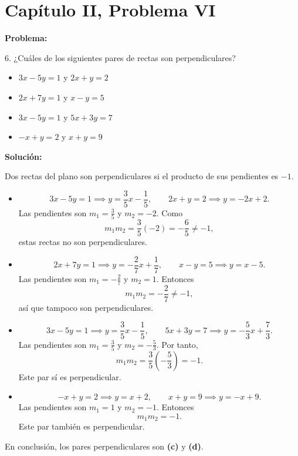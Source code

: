\section*{Capítulo II, Problema VI}

\textbf{Problema:}

6. ¿Cuáles de los siguientes pares de rectas son perpendiculares?

\begin{itemize}
    \item[(a)] $3x - 5y = 1$ y $2x + y = 2$
    \item[(b)] $2x + 7y = 1$ y $x - y = 5$
    \item[(c)] $3x - 5y = 1$ y $5x + 3y = 7$
    \item[(d)] $-x + y = 2$ y $x + y = 9$
\end{itemize}

\textbf{Solución:}

Dos rectas del plano son perpendiculares si el producto de sus pendientes es $-1$.

\begin{itemize}
    \item[(a)]
    \[
        3x - 5y = 1 \implies y = \frac{3}{5}x - \frac{1}{5},
        \qquad
        2x + y = 2 \implies y = -2x + 2.
    \]
    Las pendientes son $m_1 = \frac{3}{5}$ y $m_2 = -2$. Como
    \[
        m_1m_2 = \frac{3}{5}(-2) = -\frac{6}{5} \neq -1,
    \]
    estas rectas no son perpendiculares.

    \item[(b)]
    \[
        2x + 7y = 1 \implies y = -\frac{2}{7}x + \frac{1}{7},
        \qquad
        x - y = 5 \implies y = x - 5.
    \]
    Las pendientes son $m_1 = -\frac{2}{7}$ y $m_2 = 1$. Entonces
    \[
        m_1m_2 = -\frac{2}{7} \neq -1,
    \]
    así que tampoco son perpendiculares.

    \item[(c)]
    \[
        3x - 5y = 1 \implies y = \frac{3}{5}x - \frac{1}{5},
        \qquad
        5x + 3y = 7 \implies y = -\frac{5}{3}x + \frac{7}{3}.
    \]
    Las pendientes son $m_1 = \frac{3}{5}$ y $m_2 = -\frac{5}{3}$. Por tanto,
    \[
        m_1m_2 = \frac{3}{5}\left(-\frac{5}{3}\right) = -1.
    \]
    Este par sí es perpendicular.

    \item[(d)]
    \[
        -x + y = 2 \implies y = x + 2,
        \qquad
        x + y = 9 \implies y = -x + 9.
    \]
    Las pendientes son $m_1 = 1$ y $m_2 = -1$. Entonces
    \[
        m_1m_2 = -1.
    \]
    Este par también es perpendicular.
\end{itemize}

En conclusión, los pares perpendiculares son \textbf{(c)} y \textbf{(d)}.
